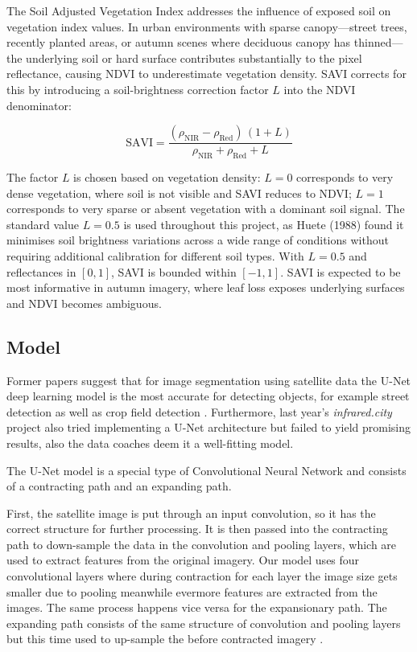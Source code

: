 The Soil Adjusted Vegetation Index \cite{huete1988} addresses the influence of exposed
soil on vegetation index values. In urban environments with sparse canopy---street trees, recently planted areas, or autumn scenes where deciduous canopy has thinned---the underlying soil or hard surface contributes substantially to the pixel reflectance, causing NDVI to underestimate vegetation density. SAVI corrects for this by introducing a soil-brightness correction factor $L$ into the NDVI denominator:

\begin{equation}
    \text{SAVI} = \frac{(\rho_{\text{NIR}} - \rho_{\text{Red}})\,(1 + L)}
                       {\rho_{\text{NIR}} + \rho_{\text{Red}} + L}
    \label{eq:savi}
\end{equation}

The factor $L$ is chosen based on vegetation density: $L = 0$ corresponds to very dense vegetation, where soil is not visible and SAVI reduces to NDVI; $L = 1$ corresponds to very sparse or absent vegetation with a dominant soil signal. The standard value $L = 0.5$ is used throughout this project, as Huete (1988) found it minimises soil brightness variations across a wide range of conditions without requiring additional calibration for different soil types. With $L = 0.5$ and reflectances in $[0, 1]$, SAVI is bounded within $[-1, 1]$. SAVI is expected to be most informative in autumn imagery, where leaf loss exposes underlying surfaces and NDVI becomes ambiguous.

\subsection{Model}
Former papers suggest that for image segmentation using satellite data the U-Net deep learning model is the most accurate for detecting objects, for example street detection \cite{pesek2024convolution} as well as crop field detection \cite{garnot2021panoptic}. Furthermore, last year's \textit{infrared.city} project also tried implementing a U-Net architecture but failed to yield promising results, also the data coaches deem it a well-fitting model.

The U-Net model is a special type of Convolutional Neural Network and consists of a contracting path and an expanding path.

First, the satellite image is put through an input convolution, so it has the correct structure for further processing. It is then passed into the contracting path to down-sample the data in the convolution and pooling layers, which are used to extract features from the original imagery. Our model uses four convolutional layers where during contraction for each layer the image size gets smaller due to pooling meanwhile evermore features are extracted from the images. The same process happens vice versa for the expansionary path.  The expanding path consists of the same structure of convolution and pooling layers but this time used to up-sample the before contracted imagery \cite{aramendia2024}. 

